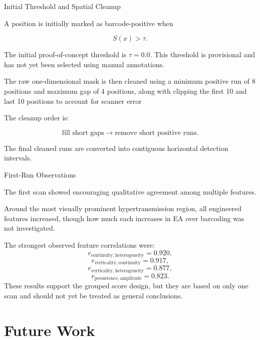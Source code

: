 \documentclass[aspectratio=169]{beamer}
\begin{document}
\begin{frame}{Initial Threshold and Spatial Cleanup}

A position is initially marked as barcode-positive when

\[
S(x) > \tau.
\]

The initial proof-of-concept threshold is $\tau=0.0$. This threshold is provisional and has not yet been selected using manual
annotations.

\vspace{0.3cm}

The raw one-dimensional mask is then cleaned using a minimum positive run of 8 positions and maximum gap of 4 positions, along with clipping the first 10 and last 10 positions to account for scanner error


The cleanup order is:

\[
\text{fill short gaps}
\rightarrow
\text{remove short positive runs}.
\]

The final cleaned runs are converted into contiguous horizontal detection
intervals.

\end{frame}

\begin{frame}{First-Run Observations}

The first scan showed encouraging qualitative agreement among multiple
features.

\vspace{0.2cm}

Around the most visually prominent hypertransmission region, all engineered features increased, though how much each increases in EA over barcoding was not investigated.

\vspace{0.3cm}

The strongest observed feature correlations were:
\[
r_{\mathrm{continuity,heterogeneity}}
=
0.920,
\]
\[
r_{\mathrm{verticality,continuity}}
=
0.917,
\]
\[
r_{\mathrm{verticality,heterogeneity}}
=
0.877,
\]
\[
r_{\mathrm{persistence,amplitude}}
=
0.823.
\]
These results support the grouped score design, but they are based on only one
scan and should not yet be treated as general conclusions.

\end{frame}


\section{Future Work}
\end{document}
